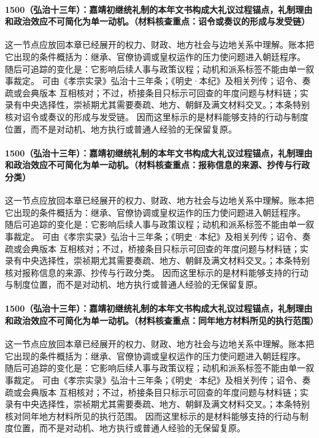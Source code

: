\paragraph{1500（弘治十三年）：嘉靖初继统礼制的本年文书构成大礼议过程锚点，礼制理由和政治效应不可简化为单一动机。（材料核查重点：诏令或奏议的形成与发受链）} 这一节点应放回本章已经展开的权力、财政、地方社会与边地关系中理解。账本把它出现的条件概括为：继承、官僚协调或皇权运作的压力使问题进入朝廷程序。 随后可追踪的变化是：它影响后续人事与政策议程；动机和派系标签不能由单一叙事裁定。 可由《孝宗实录》弘治十三年条；《明史·本纪》及相关列传；诏令、奏疏或会典版本 互相核对；不过，桥接条目只标示可回查的年度问题与材料链；实录有中央选择性，崇祯期尤其需要奏疏、地方、朝鲜及满文材料交叉。；本条特别核对诏令或奏议的形成与发受链。 因而这里标示的是材料能够支持的行动与制度位置，而不是对动机、地方执行或普通人经验的无保留复原。

\paragraph{1500（弘治十三年）：嘉靖初继统礼制的本年文书构成大礼议过程锚点，礼制理由和政治效应不可简化为单一动机。（材料核查重点：报称信息的来源、抄传与行政分类）} 这一节点应放回本章已经展开的权力、财政、地方社会与边地关系中理解。账本把它出现的条件概括为：继承、官僚协调或皇权运作的压力使问题进入朝廷程序。 随后可追踪的变化是：它影响后续人事与政策议程；动机和派系标签不能由单一叙事裁定。 可由《孝宗实录》弘治十三年条；《明史·本纪》及相关列传；诏令、奏疏或会典版本 互相核对；不过，桥接条目只标示可回查的年度问题与材料链；实录有中央选择性，崇祯期尤其需要奏疏、地方、朝鲜及满文材料交叉。；本条特别核对报称信息的来源、抄传与行政分类。 因而这里标示的是材料能够支持的行动与制度位置，而不是对动机、地方执行或普通人经验的无保留复原。

\paragraph{1500（弘治十三年）：嘉靖初继统礼制的本年文书构成大礼议过程锚点，礼制理由和政治效应不可简化为单一动机。（材料核查重点：同年地方材料所见的执行范围）} 这一节点应放回本章已经展开的权力、财政、地方社会与边地关系中理解。账本把它出现的条件概括为：继承、官僚协调或皇权运作的压力使问题进入朝廷程序。 随后可追踪的变化是：它影响后续人事与政策议程；动机和派系标签不能由单一叙事裁定。 可由《孝宗实录》弘治十三年条；《明史·本纪》及相关列传；诏令、奏疏或会典版本 互相核对；不过，桥接条目只标示可回查的年度问题与材料链；实录有中央选择性，崇祯期尤其需要奏疏、地方、朝鲜及满文材料交叉。；本条特别核对同年地方材料所见的执行范围。 因而这里标示的是材料能够支持的行动与制度位置，而不是对动机、地方执行或普通人经验的无保留复原。

